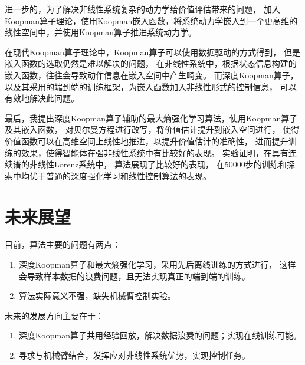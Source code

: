 \documentclass[AutoFakeBold]{LZUThesis}
\begin{document}
进一步的，为了解决非线性系统复杂的动力学给价值评估带来的问题，
加入Koopman算子理论，使用Koopman嵌入函数，将系统动力学嵌入到一个更高维的
线性空间中，并使用Koopman算子推进系统动力学。

在现代Koopman算子理论中，Koopman算子可以使用数据驱动的方式得到，
但是嵌入函数的选取仍然是难以解决的问题，
在非线性系统中，根据状态信息构建的嵌入函数，往往会导致动作信息在嵌入空间中产生畸变。
而深度Koopman算子，以及其采用的端到端的训练框架，为嵌入函数加入非线性形式的控制信息，
可以有效地解决此问题。

最后，我提出深度Koopman算子辅助的最大熵强化学习算法，使用Koopman算子及其嵌入函数，
对贝尔曼方程进行改写，将价值估计提升到嵌入空间进行，
使得价值函数可以在高维空间上线性地推进，以提升价值估计的准确性，
进而提升训练的效果，使得智能体在强非线性系统中有比较好的表现。
实验证明，在具有连续谱的非线性Lorenz系统中，
算法展现了比较好的表现，
在50000步的训练和探索中均优于普通的深度强化学习和线性控制算法的表现。

\section{未来展望}
目前，算法主要的问题有两点：
\begin{enumerate}
  \item 深度Koopman算子和最大熵强化学习，采用先后离线训练的方式进行，
    这样会导致样本数据的浪费问题，且无法实现真正的端到端的训练。
  \item 算法实际意义不强，缺失机械臂控制实验。
\end{enumerate}

未来的发展方向主要在于：
\begin{enumerate}
  \item 深度Koopman算子共用经验回放，解决数据浪费的问题；实现在线训练可能。
  \item 寻求与机械臂结合，发挥应对非线性系统优势，实现控制任务。
\end{enumerate}




\backmatter


\printbib


\Appendix
\end{document}

